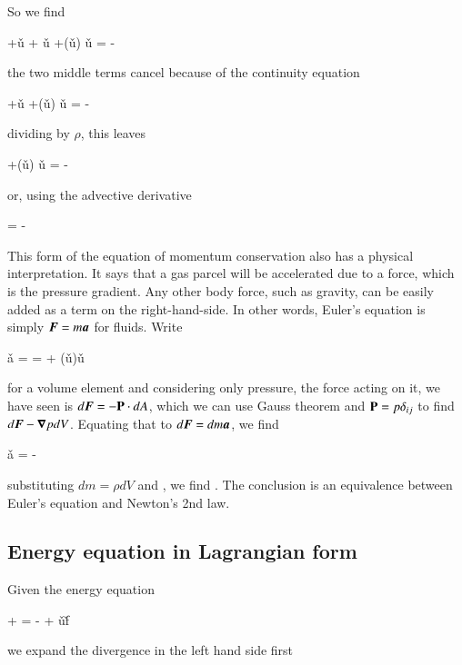 So we find 

\beq
\rho{} +\v{u}\ptderiv{\rho} +
\v{u} +\rho \left(\v{u}\cdot  \grad\right)
\v{u} = - 
\eeq

\noindent the two middle terms cancel because of the continuity equation

\beq
\rho{} +\v{u} +\rho \left(\v{u}\cdot  \grad\right)
\v{u} = - 
\eeq

\noindent dividing by $\rho$, this leaves

\beq
{} +\left(\v{u}\cdot  \grad\right) \v{u} = - 
\eeq

\noindent or, using the advective derivative

\beq
{} = - 
\label{eq:euler-lagrangian}
\eeq

This form of the equation of momentum conservation also has a physical interpretation. It says
that a gas parcel will be accelerated due to a force, which is the pressure gradient. Any other
body force, such as gravity, can be easily added as a term on the
right-hand-side. In other words, Euler's equation is simply
${\boldsymbol{F}}=m{\boldsymbol{a}}$ for fluids. Write 

\beq
\v{a} =  =  + \left(\v{u}\cdot\del\right)\v{u}
\label{eq:aadvec}
\eeq

\noindent for a volume element and considering only pressure, the
force acting on it, we have seen is $d{\boldsymbol{F}}=-\boldsymbol{\mathrm{P}}\cdot dA$, which
we can use Gauss theorem and $\boldsymbol{\mathrm{P}}=p\delta_{ij}$ to find
$d{\boldsymbol{F}}-{\boldsymbol{\nabla}}{p}dV$. Equating that to  $d{\boldsymbol{F}}=dm {\boldsymbol{a}}$, we find 

\beq
\v{a} = -
\eeq

\noindent substituting $dm=\rho dV$ and , we find
. The conclusion is an
equivalence between Euler's equation and Newton's 2nd law.

\subsection{Energy equation in Lagrangian form}

Given the energy equation 

\beq
{} +  = - +
\rho\v{u}\cdot \v{f}
\eeq

\noindent we expand the divergence in the left hand side first 

